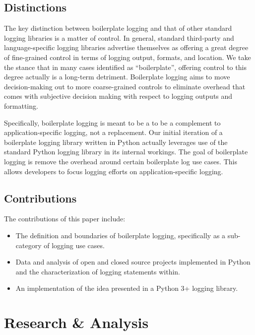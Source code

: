 \documentclass[acmsmall,review,authorversion]{acmart}
\begin{document}
    \subsection{Distinctions}

    The key distinction between boilerplate logging and that of other standard logging libraries is a matter of control. In general, standard third-party and language-specific logging libraries advertise themselves as offering a great degree of fine-grained control in terms of logging output, formats, and location. We take the stance that in many cases identified as ``boilerplate'', offering control to this degree actually is a long-term detriment. Boilerplate logging aims to move decision-making out to more coarse-grained controls to eliminate overhead that comes with subjective decision making with respect to logging outputs and formatting.

    Specifically, boilerplate logging is meant to be a to be a complement to application-specific logging, not a replacement. Our initial iteration of a boilerplate logging library written in Python actually leverages use of the standard Python logging library in its internal workings. The goal of boilerplate logging is remove the overhead around certain boilerplate log use cases. This allows developers to focus logging efforts on application-specific logging.

    \subsection{Contributions}

    The contributions of this paper include:

    \begin{itemize}
        \item The definition and boundaries of boilerplate logging, specifically as a sub-category of logging use cases.
        \item Data and analysis of open and closed source projects implemented in Python and the characterization of logging statements within.
        \item An implementation of the idea presented in a Python 3+ logging library.
    \end{itemize}

\section{Research \& Analysis}
\end{document}
